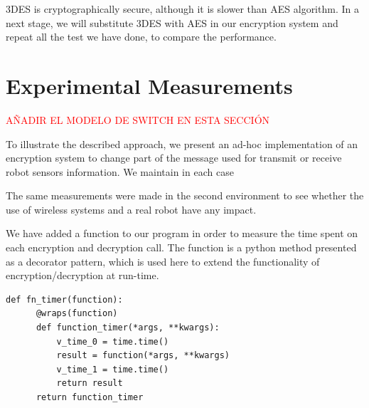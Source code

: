 \documentclass[journal,twoside]{JoPhA}
\begin{document}
3DES is cryptographically secure, although it is slower than AES algorithm. In a next stage, we will substitute 3DES with AES in our encryption system and repeat all the test we have done, to compare the performance.






\section{Experimental Measurements}

\textcolor{red}{A\~NADIR EL MODELO DE SWITCH EN ESTA SECCI\'ON}

To illustrate the described approach, we present an ad-hoc implementation of an encryption system to change part of the message used for transmit or receive robot sensors information. 
We maintain in each case 


The same measurements were made in the second environment to see whether the use of wireless systems and a real robot have any impact.



We have added a function to our program in order to measure the time spent on each encryption and decryption call. The function is a python method presented as a decorator pattern, which is used here to extend the functionality of encryption/decryption at run-time. 


{
  \footnotesize{
    \begin{Verbatim}[frame=single]
def fn_timer(function):
	  @wraps(function)
	  def function_timer(*args, **kwargs):
	      v_time_0 = time.time()
	      result = function(*args, **kwargs)
	      v_time_1 = time.time()
	      return result
	  return function_timer
    \end{Verbatim}
  }
}
\end{document}
